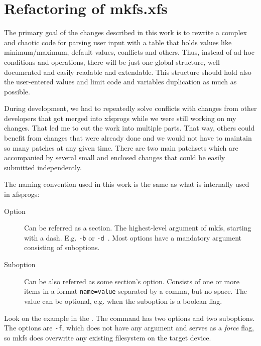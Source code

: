 
\chapter{Refactoring of mkfs.xfs} \label{chap:refactoring}

The primary goal of the changes described in this work is to rewrite a
complex and chaotic code for parsing user input with a table that holds
values like minimum/maximum, default values, conflicts and others. Thus,
instead of ad-hoc conditions and operations, there will be just one global
structure, well documented and easily readable and extendable. This
structure should hold also the user-entered values and limit code and
variables duplication as much as possible.

During development, we had to repeatedly solve conflicts with changes
from other developers that got merged into xfsprogs while we were still
working on my changes. That led me to cut the work into multiple parts.
That way, others could benefit from changes that were already done and we
would not have to maintain so many patches at any given time. There are two
main patchsets which are accompanied by several small and enclosed changes that
could be easily submitted independently.

The naming convention used in this work is the same as what is internally used
in xfsprogs:
\begin{description}
\item[Option] Can be referred as a section. The highest-level argument of
	mkfs, starting with a dash.  E.g. {\tt -b} or {\tt -d }. Most
	options have a mandatory argument consisting of suboptions.
\item[Suboption] Can be also referred as some section's option. Consists
	of one or more items in a format {\tt name=value} separated by a
	comma, but no space. The value can be optional, e.g. when the
	suboption is a boolean flag.
\end{description}

Look on the example in the . The command has
two options and two suboptions. The options are {\tt -f}, which does not
have any argument and serves as a {\em force} flag, so mkfs does overwrite
any existing filesystem on the target device.

